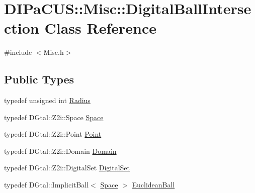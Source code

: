 \hypertarget{classDIPaCUS_1_1Misc_1_1DigitalBallIntersection}{}\section{D\+I\+Pa\+C\+US\+:\+:Misc\+:\+:Digital\+Ball\+Intersection Class Reference}
\label{classDIPaCUS_1_1Misc_1_1DigitalBallIntersection}


{\ttfamily \#include $<$Misc.\+h$>$}

\subsection*{Public Types}
\begin{DoxyCompactItemize}
\item 
typedef unsigned int \mbox{\hyperlink{classDIPaCUS_1_1Misc_1_1DigitalBallIntersection_a8c17265617201b52046579d379b3e269}{Radius}}
\item 
typedef D\+Gtal\+::\+Z2i\+::\+Space \mbox{\hyperlink{classDIPaCUS_1_1Misc_1_1DigitalBallIntersection_a70219652541b1d322f832184d5f79209}{Space}}
\item 
typedef D\+Gtal\+::\+Z2i\+::\+Point \mbox{\hyperlink{classDIPaCUS_1_1Misc_1_1DigitalBallIntersection_a7e348073cb818df2e225d22746e1d6af}{Point}}
\item 
typedef D\+Gtal\+::\+Z2i\+::\+Domain \mbox{\hyperlink{classDIPaCUS_1_1Misc_1_1DigitalBallIntersection_a23d82ed15613f37ad616a455bcce7542}{Domain}}
\item 
typedef D\+Gtal\+::\+Z2i\+::\+Digital\+Set \mbox{\hyperlink{classDIPaCUS_1_1Misc_1_1DigitalBallIntersection_aaed19d165964a423d69f19a3de0d5587}{Digital\+Set}}
\item 
typedef D\+Gtal\+::\+Implicit\+Ball$<$ \mbox{\hyperlink{classDIPaCUS_1_1Misc_1_1DigitalBallIntersection_a70219652541b1d322f832184d5f79209}{Space}} $>$ \mbox{\hyperlink{classDIPaCUS_1_1Misc_1_1DigitalBallIntersection_aae4ce51777107424826d7f7d4a53eb8a}{Euclidean\+Ball}}
\end{DoxyCompactItemize}
